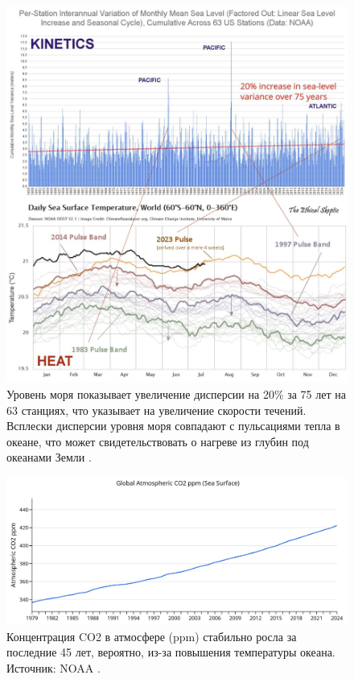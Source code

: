 \documentclass[10pt,twocolumn,letterpaper]{article}
\begin{document}
\begin{figure}[t]
\begin{center}

\includegraphics[width=1\textwidth]{sealevel.jpeg}
\end{center}
   \caption{Уровень моря показывает увеличение дисперсии на 20\% за 75 лет на 63 станциях, что указывает на увеличение скорости течений. Всплески дисперсии уровня моря совпадают с пульсациями тепла в океане, что может свидетельствовать о нагреве из глубин под океанами Земли \cite{2,129}.}
\label{fig:22}
\end{figure}

\begin{figure}[t]
\begin{center}
\includegraphics[width=1\textwidth]{co2.jpg}
\end{center}
   \caption{Концентрация CO2 в атмосфере (ppm) стабильно росла за последние 45 лет, вероятно, из-за повышения температуры океана. Источник: NOAA \cite{148,129}.}
\label{fig:23}
\end{figure}
\end{document}
